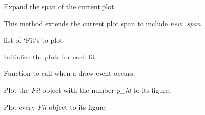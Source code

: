 \documentclass[a4paper,10pt,english]{sphinxmanual}
\begin{document}
\begin{fulllineitems}
\begin{fulllineitems}
\end{fulllineitems}


\begin{fulllineitems}
\label{index:kafe.plot.Plot.extend_span}
Expand the span of the current plot.

This method extends the current plot span to include \emph{new\_span}

\end{fulllineitems}


\begin{fulllineitems}
\label{index:kafe.plot.Plot.fits}
list of {\color{red}\bfseries{}{}`}Fit{}`s to plot

\end{fulllineitems}


\begin{fulllineitems}
\label{index:kafe.plot.Plot.init_plots}
Initialize the plots for each fit.

\end{fulllineitems}


\begin{fulllineitems}
\label{index:kafe.plot.Plot.on_draw}
Function to call when a draw event occurs.

\end{fulllineitems}


\begin{fulllineitems}
\label{index:kafe.plot.Plot.plot}
Plot the \emph{Fit} object with the number \emph{p\_id} to its figure.

\end{fulllineitems}


\begin{fulllineitems}
\label{index:kafe.plot.Plot.plot_all}
Plot every \emph{Fit} object to its figure.


\end{fulllineitems}
\end{fulllineitems}
\end{document}
